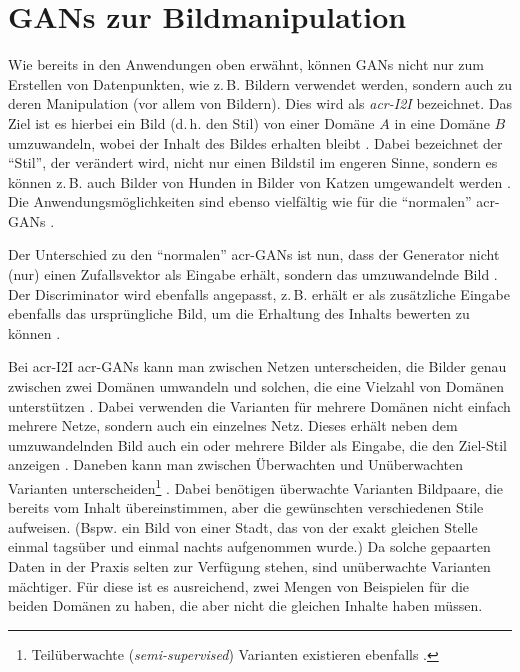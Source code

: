 \section{GANs zur Bildmanipulation}

Wie bereits in den Anwendungen oben erwähnt, können GANs nicht nur zum Erstellen
von Datenpunkten, wie z.\,B. Bildern verwendet werden, sondern auch zu deren
Manipulation (vor allem von Bildern). Dies wird als \emph{\gls{acr-I2I}}
bezeichnet. Das Ziel ist es hierbei ein Bild (d.\,h. den Stil) von einer Domäne
$A$ in eine Domäne $B$ umzuwandeln, wobei der Inhalt des Bildes erhalten bleibt
\cite{pang2021image}. Dabei bezeichnet der \enquote{Stil}, der verändert wird,
nicht nur einen Bildstil im engeren Sinne, sondern es können z.\,B. auch Bilder
von Hunden in Bilder von Katzen umgewandelt werden \cite{liu2019few}.
Die Anwendungsmöglichkeiten sind ebenso vielfältig wie für die \enquote{normalen}
\gls{acr-GAN}s \cite[vgl.][S. 1]{pang2021image}.

Der Unterschied zu den \enquote{normalen} \gls{acr-GAN}s ist nun, dass der Generator
nicht (nur) einen Zufallsvektor als Eingabe erhält, sondern das umzuwandelnde
Bild \cite{pang2021image}. Der Discriminator wird ebenfalls angepasst, z.\,B. erhält er als
zusätzliche Eingabe ebenfalls das ursprüngliche Bild, um die Erhaltung des
Inhalts bewerten zu können \cite{isola2017image}.

Bei \gls{acr-I2I} \gls{acr-GAN}s kann man zwischen Netzen unterscheiden, die
Bilder genau zwischen zwei Domänen umwandeln \cite{isola2017image,
zhu2017unpaired, ledig2017photo, demir2018patch} und solchen, die eine Vielzahl von
Domänen unterstützen
\cite{liu2019few,huang2017arbitrary,saito2020coco,anokhin2020high}. Dabei
verwenden die Varianten für mehrere Domänen nicht einfach mehrere Netze, sondern
auch ein einzelnes
Netz. Dieses erhält neben dem umzuwandelnden Bild auch ein oder mehrere Bilder
als Eingabe, die den Ziel-Stil anzeigen \cites{pang2021image}{liu2019few}.
Daneben kann man zwischen Überwachten \cite{isola2017image,ledig2017photo,demir2018patch} und Unüberwachten
\cite{liu2019few,zhu2017unpaired,huang2017arbitrary,saito2020coco,anokhin2020high,}
Varianten unterscheiden\footnote{Teilüberwachte (\emph{semi-supervised})
Varianten existieren ebenfalls \cite{pang2021image}.}  \cite[vgl.][S. 5,
11]{pang2021image}.
Dabei benötigen
überwachte Varianten Bildpaare, die bereits vom Inhalt übereinstimmen, aber die
gewünschten verschiedenen Stile aufweisen. (Bspw. ein Bild von einer Stadt, das
von der exakt gleichen Stelle einmal tagsüber und einmal nachts aufgenommen
wurde.) Da solche gepaarten Daten in der Praxis selten zur Verfügung stehen,
sind unüberwachte Varianten mächtiger. Für diese ist es ausreichend, zwei Mengen
von Beispielen für die beiden Domänen zu haben, die aber nicht die gleichen
Inhalte haben müssen.